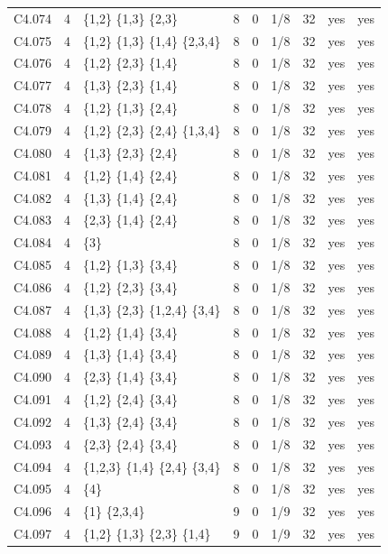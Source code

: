 {\begin{longtable}{@{}llp{6.2cm}rllrll@{}}
C4.074 & 4 & \{1,2\} \{1,3\} \{2,3\} & 8 & 0 & 1/8 & 32 & yes & yes \\
C4.075 & 4 & \{1,2\} \{1,3\} \{1,4\} \{2,3,4\} & 8 & 0 & 1/8 & 32 & yes & yes \\
C4.076 & 4 & \{1,2\} \{2,3\} \{1,4\} & 8 & 0 & 1/8 & 32 & yes & yes \\
C4.077 & 4 & \{1,3\} \{2,3\} \{1,4\} & 8 & 0 & 1/8 & 32 & yes & yes \\
C4.078 & 4 & \{1,2\} \{1,3\} \{2,4\} & 8 & 0 & 1/8 & 32 & yes & yes \\
C4.079 & 4 & \{1,2\} \{2,3\} \{2,4\} \{1,3,4\} & 8 & 0 & 1/8 & 32 & yes & yes \\
C4.080 & 4 & \{1,3\} \{2,3\} \{2,4\} & 8 & 0 & 1/8 & 32 & yes & yes \\
C4.081 & 4 & \{1,2\} \{1,4\} \{2,4\} & 8 & 0 & 1/8 & 32 & yes & yes \\
C4.082 & 4 & \{1,3\} \{1,4\} \{2,4\} & 8 & 0 & 1/8 & 32 & yes & yes \\
C4.083 & 4 & \{2,3\} \{1,4\} \{2,4\} & 8 & 0 & 1/8 & 32 & yes & yes \\
C4.084 & 4 & \{3\} & 8 & 0 & 1/8 & 32 & yes & yes \\
C4.085 & 4 & \{1,2\} \{1,3\} \{3,4\} & 8 & 0 & 1/8 & 32 & yes & yes \\
C4.086 & 4 & \{1,2\} \{2,3\} \{3,4\} & 8 & 0 & 1/8 & 32 & yes & yes \\
C4.087 & 4 & \{1,3\} \{2,3\} \{1,2,4\} \{3,4\} & 8 & 0 & 1/8 & 32 & yes & yes \\
C4.088 & 4 & \{1,2\} \{1,4\} \{3,4\} & 8 & 0 & 1/8 & 32 & yes & yes \\
C4.089 & 4 & \{1,3\} \{1,4\} \{3,4\} & 8 & 0 & 1/8 & 32 & yes & yes \\
C4.090 & 4 & \{2,3\} \{1,4\} \{3,4\} & 8 & 0 & 1/8 & 32 & yes & yes \\
C4.091 & 4 & \{1,2\} \{2,4\} \{3,4\} & 8 & 0 & 1/8 & 32 & yes & yes \\
C4.092 & 4 & \{1,3\} \{2,4\} \{3,4\} & 8 & 0 & 1/8 & 32 & yes & yes \\
C4.093 & 4 & \{2,3\} \{2,4\} \{3,4\} & 8 & 0 & 1/8 & 32 & yes & yes \\
C4.094 & 4 & \{1,2,3\} \{1,4\} \{2,4\} \{3,4\} & 8 & 0 & 1/8 & 32 & yes & yes \\
C4.095 & 4 & \{4\} & 8 & 0 & 1/8 & 32 & yes & yes \\
C4.096 & 4 & \{1\} \{2,3,4\} & 9 & 0 & 1/9 & 32 & yes & yes \\
C4.097 & 4 & \{1,2\} \{1,3\} \{2,3\} \{1,4\} & 9 & 0 & 1/9 & 32 & yes & yes \\

\end{longtable}}
